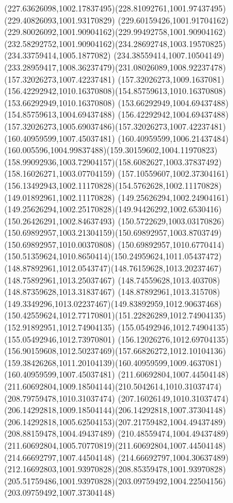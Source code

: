 {{	\curveto(227.63626098,1002.17837495)(228.81092761,1001.97437495)(229.40826093,1001.93170829)
	\curveto(229.60159426,1001.91704162)(229.80026092,1001.90904162)(229.99492758,1001.90904162)
	\curveto(232.58292752,1001.90904162)(234.28692748,1003.19570825)(234.33759414,1005.1877082)
	\curveto(234.38559414,1007.10504149)(233.28959417,1008.36237479)(231.08026089,1008.92237478)
	\moveto(157.32026273,1007.42237481)
	\curveto(157.32026273,1009.1637081)(156.42292942,1010.16370808)(154.85759613,1010.16370808)
	\lineto(153.66292949,1010.16370808)
	\lineto(153.66292949,1004.69437488)
	\lineto(154.85759613,1004.69437488)
	\curveto(156.42292942,1004.69437488)(157.32026273,1005.69037486)(157.32026273,1007.42237481)
	\moveto(160.40959599,1007.45037481)
	\curveto(160.40959599,1006.21437484)(160.005596,1004.99837488)(159.30159602,1004.11970823)
	\curveto(158.99092936,1003.72904157)(158.6082627,1003.37837492)(158.16026271,1003.07704159)
	\curveto(157.10559607,1002.37304161)(156.13492943,1002.11170828)(154.5762628,1002.11170828)
	\lineto(149.01892961,1002.11170828)
	\lineto(149.25626294,1002.24904161)
	\curveto(149.25626294,1002.25170828)(149.94426292,1002.6530416)(150.26426291,1002.84637493)
	\curveto(150.5722629,1003.03170826)(150.69892957,1003.21304159)(150.69892957,1003.8703749)
	\lineto(150.69892957,1010.00370808)
	\curveto(150.69892957,1010.6770414)(150.51359624,1010.8650414)(150.24959624,1011.05437472)
	\curveto(148.87892961,1012.0543747)(148.76159628,1013.20237467)(148.75892961,1013.25037467)
	\lineto(148.74559628,1013.403708)
	\lineto(148.87359628,1013.31837467)
	\curveto(148.87892961,1013.315708)(149.3349296,1013.02237467)(149.83892959,1012.90637468)
	\curveto(150.42559624,1012.77170801)(151.22826289,1012.74904135)(152.91892951,1012.74904135)
	\lineto(155.05492946,1012.74904135)
	\lineto(155.05492946,1012.73970801)
	\curveto(156.12026276,1012.69704135)(156.90159608,1012.50237469)(157.66826272,1012.10104136)
	\curveto(159.38426268,1011.20104139)(160.40959599,1009.4637081)(160.40959599,1007.45037481)
	\moveto(211.60692804,1007.44504148)
	\curveto(211.60692804,1009.18504144)(210.5042614,1010.31037474)(208.79759478,1010.31037474)
	\curveto(207.16026149,1010.31037474)(206.14292818,1009.18504144)(206.14292818,1007.37304148)
	\curveto(206.14292818,1005.62504153)(207.21759482,1004.49437489)(208.88159478,1004.49437489)
	\curveto(210.48559474,1004.49437489)(211.60692804,1005.70770819)(211.60692804,1007.44504148)
	\moveto(214.66692797,1007.44504148)
	\curveto(214.66692797,1004.30637489)(212.16692803,1001.93970828)(208.85359478,1001.93970828)
	\curveto(205.51759486,1001.93970828)(203.09759492,1004.22504156)(203.09759492,1007.37304148)
}}

